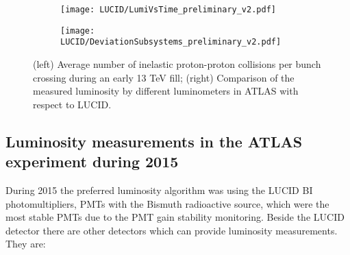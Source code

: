 \begin{figure}
\centering
\begin{subfigure}{.5\textwidth}
  \centering
  \texttt{[image: LUCID/LumiVsTime\_preliminary\_v2.pdf]}
  \label{fig:sub3}
\end{subfigure}%
\begin{subfigure}{.5\textwidth}
  \centering
  \texttt{[image: LUCID/DeviationSubsystems\_preliminary\_v2.pdf]}
  \label{fig:sub4}
\end{subfigure}
\caption{(left) Average number of inelastic proton-proton collisions per bunch crossing during an early 13 TeV fill; 
(right) Comparison of the measured luminosity by different luminometers in ATLAS with respect to LUCID.}
\label{fig:LumiVsTime}
\end{figure}

\subsection{Luminosity measurements in the ATLAS experiment during 2015}
\label{subsec:lumi_2015_2016}
During 2015 the preferred luminosity algorithm was using the LUCID BI photomultipliers, 
PMTs with the Bismuth radioactive source, which were the most stable PMTs due to the PMT gain stability monitoring.
Beside the LUCID detector there are other detectors which can provide luminosity measurements. They are: 

